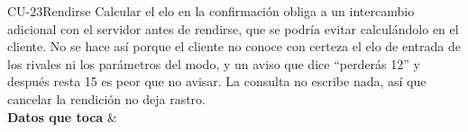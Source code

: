 \begin{fichacu}{CU-23}{Rendirse}
{    Calcular el elo en la confirmación obliga a un intercambio adicional con el servidor antes de rendirse, que se podría evitar calculándolo en el cliente. No se hace así porque el cliente no conoce con certeza el elo de entrada de los rivales ni los parámetros del modo, y un aviso que dice ``perderás 12'' y después resta 15 es peor que no avisar. La consulta no escribe nada, así que cancelar la rendición no deja rastro.} \\ \hline
  \textbf{Datos que toca} &  \\ \hline
\end{fichacu}
\clearpage
